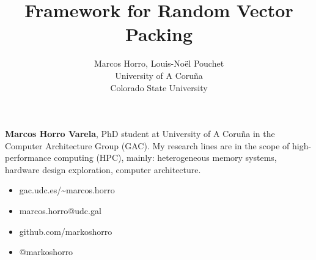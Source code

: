\documentclass[xcolor=table,hideothersubsections,aspectratio=1610]{beamer}
\title[CSU Internship]{\color{white}\textbf{Framework for Random Vector Packing}}
\subtitle{\color{white}}
\author[Marcos Horro]{
	Marcos Horro, Louis-Noël Pouchet\\
	University of A Coruña\\
	Colorado State University
} %
\date{}
\begin{document}
\begin{frame}[plain,t]
    \titlepage
\end{frame}

\begin{frame}[plain]
    \tableofcontents[hideallsubsections]
\end{frame}

\begin{frame}[plain]
    \textbf{Marcos Horro Varela}, PhD student at University of A Coruña in the Computer Architecture Group (GAC). My research lines are in the scope of high-performance computing (HPC), mainly: heterogeneous memory systems, hardware design exploration, computer architecture.

    \begin{itemize}
        \item gac.udc.es/\~{}marcos.horro
        \item marcos.horro@udc.gal
        \item github.com/markoshorro
        \item @markoshorro
    \end{itemize}
\end{frame}

\end{document}
